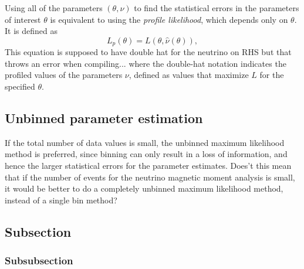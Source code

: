 Using all of the parameters $\left(\theta,\nu\right)$  to find the statistical errors in the parameters of interest $\theta$ is equivalent to using the \textit{profile likelihood}, which depends only on $\theta$. It is defined as
\begin{equation}
L_p\left(\theta\right)=L\left(\theta,\hat{\nu}\left(\theta\right)\right),
\end{equation}
This equation is supposed to have double hat for the neutrino on RHS but that throws an error when compiling...
where the double-hat notation indicates the profiled values of the parameters $\nu$, defined as values that maximize $L$ for the specified $\theta$.

\subsection{Unbinned parameter estimation}
If the total number of data values is small, the unbinned maximum likelihood method is preferred, since binning can only result in a loss of information, and hence the larger statistical errors for the parameter estimates.
Does't this mean that if the number of events for the neutrino magnetic moment analysis is small, it would be better to do a completely unbinned maximum likelihood method, instead of a single bin method?


\subsection{Subsection}

\subsubsection{Subsubsection}
\fi